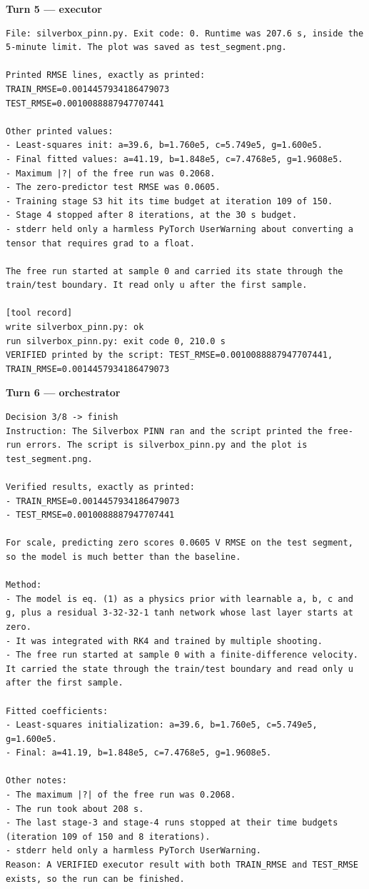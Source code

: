 \noindent\textbf{Turn 5 --- executor}
\begin{lstlisting}
File: silverbox_pinn.py. Exit code: 0. Runtime was 207.6 s, inside the 5-minute limit. The plot was saved as test_segment.png.

Printed RMSE lines, exactly as printed:
TRAIN_RMSE=0.0014457934186479073
TEST_RMSE=0.0010088887947707441

Other printed values:
- Least-squares init: a=39.6, b=1.760e5, c=5.749e5, g=1.600e5.
- Final fitted values: a=41.19, b=1.848e5, c=7.4768e5, g=1.9608e5.
- Maximum |?| of the free run was 0.2068.
- The zero-predictor test RMSE was 0.0605.
- Training stage S3 hit its time budget at iteration 109 of 150.
- Stage 4 stopped after 8 iterations, at the 30 s budget.
- stderr held only a harmless PyTorch UserWarning about converting a tensor that requires grad to a float.

The free run started at sample 0 and carried its state through the train/test boundary. It read only u after the first sample.

[tool record]
write silverbox_pinn.py: ok
run silverbox_pinn.py: exit code 0, 210.0 s
VERIFIED printed by the script: TEST_RMSE=0.0010088887947707441, TRAIN_RMSE=0.0014457934186479073
\end{lstlisting}
\noindent\textbf{Turn 6 --- orchestrator}
\begin{lstlisting}
Decision 3/8 -> finish
Instruction: The Silverbox PINN ran and the script printed the free-run errors. The script is silverbox_pinn.py and the plot is test_segment.png.

Verified results, exactly as printed:
- TRAIN_RMSE=0.0014457934186479073
- TEST_RMSE=0.0010088887947707441

For scale, predicting zero scores 0.0605 V RMSE on the test segment, so the model is much better than the baseline.

Method:
- The model is eq. (1) as a physics prior with learnable a, b, c and g, plus a residual 3-32-32-1 tanh network whose last layer starts at zero.
- It was integrated with RK4 and trained by multiple shooting.
- The free run started at sample 0 with a finite-difference velocity. It carried the state through the train/test boundary and read only u after the first sample.

Fitted coefficients:
- Least-squares initialization: a=39.6, b=1.760e5, c=5.749e5, g=1.600e5.
- Final: a=41.19, b=1.848e5, c=7.4768e5, g=1.9608e5.

Other notes:
- The maximum |?| of the free run was 0.2068.
- The run took about 208 s.
- The last stage-3 and stage-4 runs stopped at their time budgets (iteration 109 of 150 and 8 iterations).
- stderr held only a harmless PyTorch UserWarning.
Reason: A VERIFIED executor result with both TRAIN_RMSE and TEST_RMSE exists, so the run can be finished.
\end{lstlisting}
